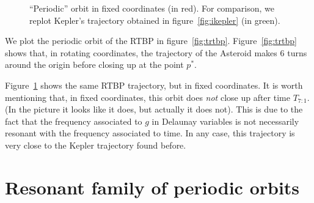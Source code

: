 \documentclass[a4paper]{amsart}
\theoremstyle{remark}
\begin{document}
\begin{figure}[!htbp]
\caption{``Periodic'' orbit in fixed coordinates (in red).
For comparison, we replot Kepler's trajectory obtained in
figure~\ref{fig:ikepler} (in green).}
\label{fig:trtbp_sideral}
\end{figure}

We plot the periodic orbit of the RTBP in figure~\ref{fig:trtbp}.
Figure~\ref{fig:trtbp} shows that, in rotating coordinates, the trajectory of
the Asteroid makes 6 turns around the origin before closing up at the point
$p^*$.

Figure~\ref{fig:trtbp_sideral} shows the same RTBP trajectory, but in
fixed coordinates. 
It is worth mentioning that, in fixed coordinates, this orbit does
\emph{not} close up after time $T_{7:1}$. 
(In the picture it looks like it does, but actually it does not).
This is due to the fact that the frequency associated to $g$ in
Delaunay variables is not necessarily resonant with the frequency
associated to time.
In any case, this trajectory is very close to the Kepler trajectory
found before. 

\section{Resonant family of periodic orbits}
\end{document}
